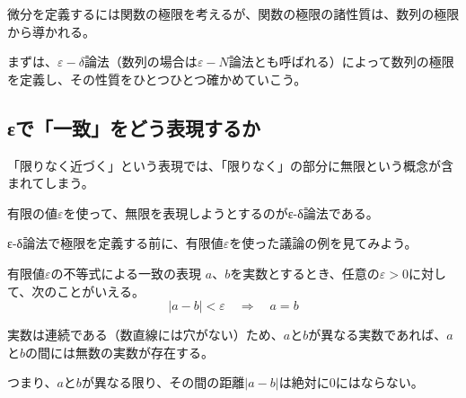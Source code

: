 \documentclass[../math-imaging]{subfiles}
\begin{document}
微分を定義するには関数の極限を考えるが、関数の極限の諸性質は、数列の極限から導かれる。

まずは、$\varepsilon - \delta $論法（数列の場合は$\varepsilon - N$論法とも呼ばれる）によって数列の極限を定義し、その性質をひとつひとつ確かめていこう。

\subsection{εで「一致」をどう表現するか}

「限りなく近づく」という表現では、「限りなく」の部分に無限という概念が含まれてしまう。

有限の値$\varepsilon$を使って、無限を表現しようとするのがε-δ論法である。

\froufrou

ε-δ論法で極限を定義する前に、有限値$\varepsilon$を使った議論の例を見てみよう。

\begin{theorem}{有限値$\varepsilon $の不等式による一致の表現}\label{theorem:有限値εの不等式による一致の表現}
  \newline
  $a$、$b$を実数とするとき、任意の$\varepsilon >0$に対して、次のことがいえる。
  \LARGE
  \begin{equation}
    |a-b|<\varepsilon \quad \Longrightarrow  \quad a=b
  \end{equation}
\end{theorem}

実数は連続である（数直線には穴がない）ため、$a$と$b$が異なる実数であれば、$a$と$b$の間には無数の実数が存在する。

つまり、$a$と$b$が異なる限り、その間の距離$|a-b|$は絶対に$0$にはならない。
\end{document}
